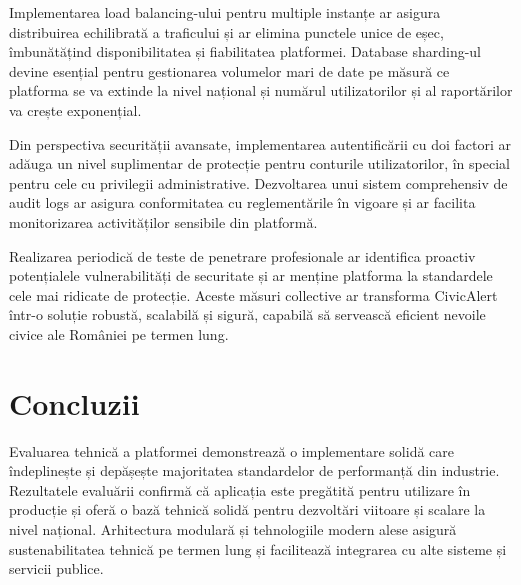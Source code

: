 \documentclass[12pt,a4paper]{report}
\begin{document}
Implementarea load balancing-ului pentru multiple instanțe ar asigura distribuirea echilibrată a traficului și ar elimina punctele unice de eșec, îmbunătățind disponibilitatea și fiabilitatea platformei. Database sharding-ul devine esențial pentru gestionarea volumelor mari de date pe măsură ce platforma se va extinde la nivel național și numărul utilizatorilor și al raportărilor va crește exponențial.

Din perspectiva securității avansate, implementarea autentificării cu doi factori ar adăuga un nivel suplimentar de protecție pentru conturile utilizatorilor, în special pentru cele cu privilegii administrative. Dezvoltarea unui sistem comprehensiv de audit logs ar asigura conformitatea cu reglementările în vigoare și ar facilita monitorizarea activităților sensibile din platformă.

Realizarea periodică de teste de penetrare profesionale ar identifica proactiv potențialele vulnerabilități de securitate și ar menține platforma la standardele cele mai ridicate de protecție. Aceste măsuri collective ar transforma CivicAlert într-o soluție robustă, scalabilă și sigură, capabilă să servească eficient nevoile civice ale României pe termen lung.

\section{Concluzii}

Evaluarea tehnică a platformei  demonstrează o implementare solidă care îndeplinește și depășește majoritatea standardelor de performanță din industrie.
Rezultatele evaluării confirmă că aplicația este pregătită pentru utilizare în producție și oferă o bază tehnică solidă pentru dezvoltări viitoare și scalare la nivel național.
Arhitectura modulară și tehnologiile modern alese   asigură sustenabilitatea tehnică pe termen lung și facilitează integrarea cu alte sisteme și servicii publice.


\newpage
\end{document}
